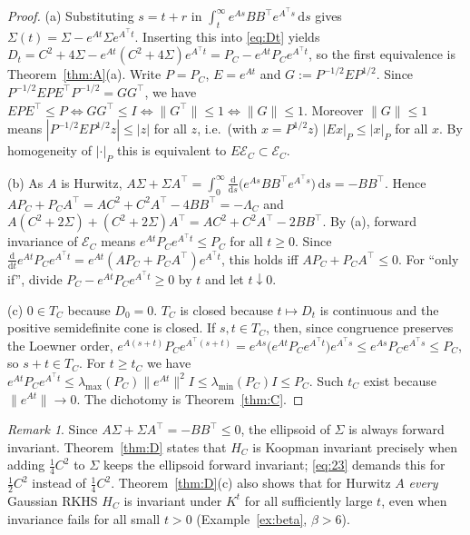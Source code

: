 \documentclass[11pt]{article}
\theoremstyle{definition}
\theoremstyle{remark}
\newtheorem{remark}[lemma]{Remark}
\newcommand{\dd}{\,\mathrm{d}}
\newcommand{\tp}{\top}
\begin{document}
\begin{proof}
(a) Substituting $s=t+r$ in $\int_t^\infty e^{As}BB^\tp e^{A^\tp s}\dd s$ gives $\Sigma(t)=\Sigma-e^{At}\Sigma e^{A^\tp t}$.
Inserting this into \eqref{eq:Dt} yields $D_t=C^2+4\Sigma-e^{At}(C^2+4\Sigma)e^{A^\tp t}=P_C-e^{At}P_Ce^{A^\tp t}$, so the
first equivalence is Theorem~\ref{thm:A}(a). Write $P=P_C$, $E=e^{At}$ and $G:=P^{-1/2}EP^{1/2}$. Since
$P^{-1/2}EPE^\tp P^{-1/2}=GG^\tp$, we have $EPE^\tp\le P\iff GG^\tp\le I\iff\|G^\tp\|\le1\iff\|G\|\le1$. Moreover $\|G\|\le1$ means
$|P^{-1/2}EP^{1/2}z|\le|z|$ for all $z$, i.e.\ (with $x=P^{1/2}z$) $|Ex|_{P}\le|x|_{P}$ for all $x$. By homogeneity of
$|\cdot|_P$ this is equivalent to $E\mathcal E_C\subset\mathcal E_C$.

(b) As $A$ is Hurwitz, $A\Sigma+\Sigma A^\tp=\int_0^\infty\frac{\mathrm d}{\mathrm ds}\bigl(e^{As}BB^\tp e^{A^\tp s}\bigr)\dd s=-BB^\tp$.
Hence $AP_C+P_CA^\tp=AC^2+C^2A^\tp-4BB^\tp=-\Lambda_C$ and
$A(C^2+2\Sigma)+(C^2+2\Sigma)A^\tp=AC^2+C^2A^\tp-2BB^\tp$. By (a), forward invariance of $\mathcal E_C$ means
$e^{At}P_Ce^{A^\tp t}\le P_C$ for all $t\ge0$. Since
$\frac{\mathrm d}{\mathrm dt}e^{At}P_Ce^{A^\tp t}=e^{At}(AP_C+P_CA^\tp)e^{A^\tp t}$, this holds iff $AP_C+P_CA^\tp\le0$.
For ``only if'', divide $P_C-e^{At}P_Ce^{A^\tp t}\ge0$ by $t$ and let $t\downarrow0$.

(c) $0\in T_C$ because $D_0=0$. $T_C$ is closed because $t\mapsto D_t$ is continuous and the positive semidefinite cone is
closed. If $s,t\in T_C$, then, since congruence preserves the Loewner order,
$e^{A(s+t)}P_Ce^{A^\tp(s+t)}=e^{As}\bigl(e^{At}P_Ce^{A^\tp t}\bigr)e^{A^\tp s}\le e^{As}P_Ce^{A^\tp s}\le P_C$, so $s+t\in T_C$.
For $t\ge t_C$ we have $e^{At}P_Ce^{A^\tp t}\le\lambda_{\max}(P_C)\|e^{At}\|^2I\le\lambda_{\min}(P_C)I\le P_C$. Such $t_C$
exist because $\|e^{At}\|\to0$. The dichotomy is Theorem~\ref{thm:C}.
\end{proof}

\begin{remark}
Since $A\Sigma+\Sigma A^\tp=-BB^\tp\le0$, the ellipsoid of $\Sigma$ is always forward invariant. Theorem~\ref{thm:D}
states that $H_C$ is Koopman invariant precisely when adding $\frac14C^2$ to $\Sigma$ keeps the ellipsoid forward
invariant; \eqref{eq:23} demands this for $\frac12C^2$ instead of $\frac14C^2$. Theorem~\ref{thm:D}(c) also shows that for Hurwitz
$A$ \emph{every} Gaussian RKHS $H_C$ is invariant under $K^t$ for all sufficiently large $t$, even when invariance fails
for all small $t>0$ (Example~\ref{ex:beta}, $\beta>6$).
\end{remark}
\end{document}
